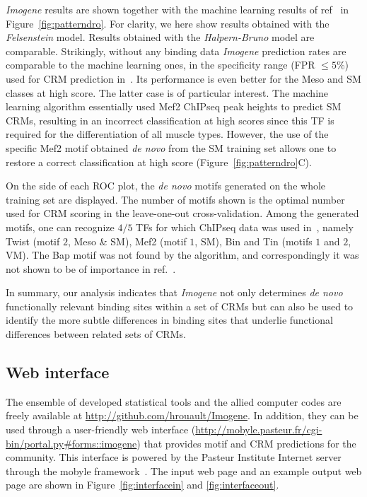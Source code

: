 \documentclass[a4,center,fleqn]{NAR}
\begin{document}
{\em Imogene} results are shown  together with the machine learning results of
ref~\cite{pmid19890324} in Figure~\ref{fig:patterndro}.
For clarity, we here show results obtained with the {\em Felsenstein} model.
Results obtained with the {\em Halpern-Bruno} model are comparable.
Strikingly, without any binding data {\em Imogene} prediction rates are 
comparable to the machine learning ones, in the  specificity range (FPR
$\leq 5\%$) used for CRM prediction in~\cite{pmid19890324}.
Its performance is even better for the Meso and SM classes at high score. 
The latter case is of particular interest. 
The machine learning algorithm essentially used Mef2 ChIPseq peak heights to
predict SM CRMs, resulting in an incorrect classification at high scores since
this TF is required for the differentiation of all muscle types. 
However, the use of the specific Mef2 motif obtained \textit{de novo} from the
SM training set allows one to restore a correct classification at high score
(Figure~\ref{fig:patterndro}C).

On the side of each ROC plot,  the \textit{de novo} motifs generated on
the whole training set are displayed. 
The number of motifs shown is the optimal number used for CRM scoring in the
leave-one-out cross-validation. 
Among the generated motifs, one can recognize $4/5$ TFs for which ChIPseq data
was used in~\cite{pmid19890324}, namely Twist (motif $2$, Meso \& SM), Mef2
(motif $1$, SM),  Bin and Tin (motifs $1$ and $2$, VM). 
The Bap motif was not found by the algorithm, and correspondingly it was not
shown to be of importance in ref.~\cite{pmid19890324}.
 
 In summary, our analysis indicates that {\em Imogene}  not only determines
 {\em de novo} functionally relevant binding sites within a set of CRMs but can
 also be used to identify the more subtle differences in binding sites that
 underlie functional differences between related sets of CRMs.
 
\subsection*{Web interface}
The ensemble of developed statistical tools and the allied computer codes are
freely available at \url{http://github.com/hrouault/Imogene}.
In addition, they can be used through a user-friendly web interface
(\url{http://mobyle.pasteur.fr/cgi-bin/portal.py#forms::imogene}) that provides
motif and CRM predictions for the community.
This interface is powered by the Pasteur Institute Internet server through the
mobyle framework~\cite{pmid19689959}.
The input web page and an example output web page are shown in
Figure~\ref{fig:interfacein} and \ref{fig:interfaceout}.
\end{document}
